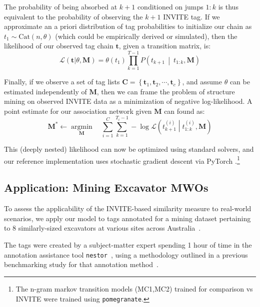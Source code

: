 \documentclass[%
	12pt,
		oneside,
		letterpaper
]{book}
\begin{document}
The probability of being absorbed at \(k+1\) conditioned on jumps \(1:k\) is thus equivalent to the probability of observing the \(k+1\) INVITE tag.
If we approximate an a priori distribution of tag probabilities to initialize our chain as \(t_1\sim\text{Cat}(n,\theta)\) (which could be empirically derived or simulated), then the likelihood of our observed tag chain \(\mathbf{t}\), given a transition matrix, is:
\[
\mathcal{L}\left(\mathbf{t}| \theta, \mathbf{M}\right) =
        \theta(t_1)\prod_{k=1}^{T-1} P\left(t_{k+1}\,\middle|\ t_{1:k},\mathbf{M}\right)
\]

Finally, if we observe a set of tag lists \(\mathbf{C} = \left\{ \mathbf{t}_1, \mathbf{t}_2, \cdots, \mathbf{t}_{c} \right\}\), and assume \(\theta\) can be estimated independently of \(\mathbf{M}\), then we can frame the problem of structure mining on observed INVITE data as a minimization of negative log-likelihood.
A point estimate for our association network given \(\mathbf{M}\) can found as:
\[
    \mathbf{M}^* \leftarrow \operatorname*{argmin}_{\mathbf{M}} \quad
    \sum_{i=1}^{C}
    \sum_{k=1}^{T_i-1}
        -\log \mathcal{L} \left(t^{(i)}_{k+1} \middle| t^{(i)}_{1:k},\mathbf{M}\right)
\]

This (deeply nested) likelihood can now be optimized using standard solvers, and our reference implementation uses stochastic gradient descent via PyTorch \autocite{AutomaticdifferentiationPyTorch_Paszke2017}.\footnote{
  The n-gram markov transition models (MC1,MC2) trained for comparison vs INVITE were trained using \texttt{pomegranate}\autocite{Pomegranatefastflexible_Schreiber2018}.}

\subsection{Application: Mining Excavator MWOs}\label{application-mining-excavator-mwos}

To assess the applicability of the INVITE-based similarity measure to real-world scenarios, we apply our model to tags annotated for a mining dataset pertaining to 8 similarly-sized excavators at various sites across Australia~\autocite{Whyautonomousassets_Hodkiewicz2017,Cleaninghistoricalmaintenance_Hodkiewicz2016}.

The tags were created by a subject-matter expert spending 1 hour of time in the annotation assistance tool \texttt{nestor}~\autocite{NestorToolNatural_Sexton2019}, using a methodology outlined in a previous benchmarking study for that annotation method~\autocite{BenchmarkingKeywordExtraction_Sexton2018}.
\end{document}
